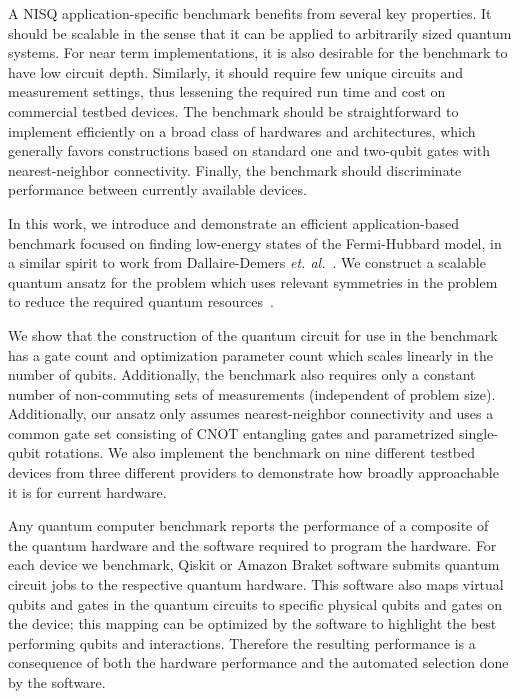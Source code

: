 \documentclass[
prx,
superscriptaddress,
twocolumn,
longbibliography
]{revtex4-1}
\begin{document}
A NISQ application-specific benchmark benefits from several key properties. It should be scalable in the sense that it can be applied to arbitrarily sized quantum systems. For near term implementations, it is also desirable for the benchmark to have low circuit depth.  Similarly, it should require few unique circuits and measurement settings, thus lessening the required run time and cost on commercial testbed devices. The benchmark should be straightforward to implement efficiently on a broad class of hardwares and architectures, which generally favors constructions based on standard one and two-qubit gates with nearest-neighbor connectivity. Finally, the benchmark should discriminate performance between currently available devices. 

In this work, we introduce and demonstrate an efficient application-based benchmark focused on finding low-energy states of the Fermi-Hubbard model, in a similar spirit to work from Dallaire-Demers {\it{et. al.}}~\cite{dallairedemers2020application}. We construct a scalable quantum ansatz for the problem which uses relevant symmetries in the problem to reduce the required quantum resources~\cite{gard2019efficient,barron2020vqe,doi.org/10.1002/qute.202100012,Barkoutsos2018}.

We show that the construction of the quantum circuit for use in the benchmark has a gate count and optimization parameter count which scales linearly in the number of qubits. Additionally, the benchmark also requires only a constant number of non-commuting sets of measurements (independent of problem size). Additionally, our ansatz only assumes nearest-neighbor connectivity and uses a common gate set consisting of CNOT entangling gates and parametrized single-qubit rotations. We also implement the benchmark on nine different testbed devices from three different providers to demonstrate how broadly approachable it is for current hardware.

Any quantum computer benchmark reports the performance of a composite of the quantum hardware and the software required to program the hardware. For each device we benchmark, Qiskit or Amazon Braket software submits quantum circuit jobs to the respective quantum hardware. This software also maps virtual qubits and gates in the quantum circuits to specific physical qubits and gates on the device; this mapping can be optimized by the software to highlight the best performing qubits and interactions. Therefore the resulting performance is a consequence of both the hardware performance and the automated selection done by the software.
\end{document}
